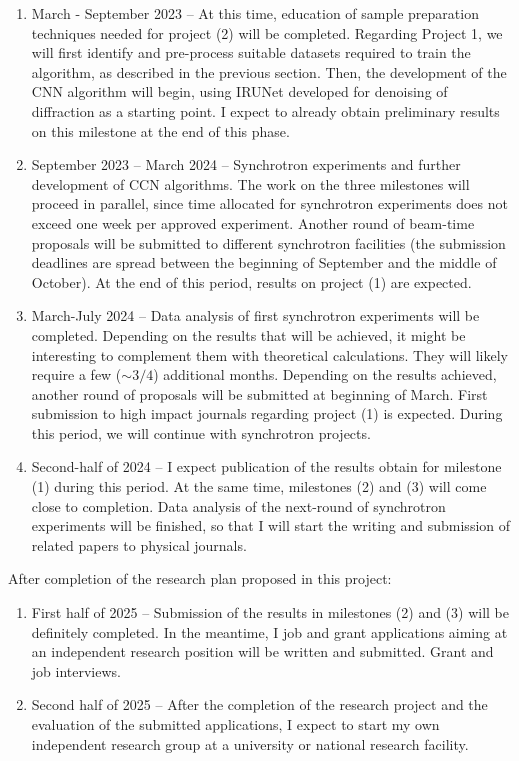 \documentclass[a4paper, 12pt]{article}
\begin{document}
\begin{enumerate}
    \item March - September 2023 – At this time, education of sample preparation techniques needed for project (2) will be completed. Regarding Project 1, we will first identify and pre-process suitable datasets required to train the algorithm, as described in the previous section. Then, the development of the CNN algorithm will begin, using IRUNet developed for denoising of diffraction as a starting point. I expect to already obtain preliminary results on this milestone at the end of this phase.

    \item September 2023 -- March 2024 – Synchrotron experiments and further development of CCN algorithms. The work on the three milestones will proceed in parallel, since time allocated for synchrotron experiments does not exceed one week per approved experiment. Another round of beam-time proposals will be submitted to different synchrotron facilities (the submission deadlines are spread between the beginning of September and the middle of October). At the end of this period, results on project (1) are expected.

    \item March-July 2024 – Data analysis of first synchrotron experiments will be completed. Depending on the results that will be achieved, it might be interesting to complement them with theoretical calculations. They will likely require a few ($\sim3/4$) additional months. Depending on the results achieved, another round of proposals will be submitted at beginning of March. First submission to high impact journals regarding project (1) is expected. During this period, we will continue with synchrotron projects.

    \item Second-half of 2024 – I expect publication of the results obtain for milestone (1) during this period. At the same time, milestones (2) and (3) will come close to completion. Data analysis of the next-round of synchrotron experiments will be finished, so that I will start the writing and submission of related papers to physical journals.
    
\end{enumerate}

After completion of the research plan proposed in this project:

\begin{enumerate}[resume]
    \item First half of 2025 – Submission of the results in milestones (2) and (3) will be definitely completed. In the meantime, I job and grant applications aiming at an independent research position will be written and submitted. Grant and job interviews.

    \item 	Second half of 2025 – After the completion of the research project and the evaluation of the submitted applications, I expect to start my own independent research group at a university or national research facility.
\end{enumerate}
\end{document}
